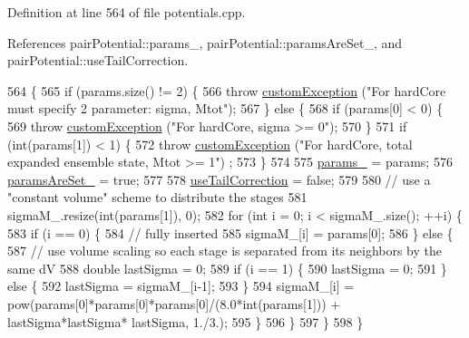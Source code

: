 Definition at line 564 of file potentials.\-cpp.



References pair\-Potential\-::params\-\_\-, pair\-Potential\-::params\-Are\-Set\-\_\-, and pair\-Potential\-::use\-Tail\-Correction.


\begin{DoxyCode}
564                                                                \{
565     \textcolor{keywordflow}{if} (params.size() != 2) \{
566         \textcolor{keywordflow}{throw} \hyperlink{classcustom_exception}{customException} (\textcolor{stringliteral}{"For hardCore must specify 2 parameter: sigma, Mtot"});
567     \} \textcolor{keywordflow}{else} \{
568         \textcolor{keywordflow}{if} (params[0] < 0) \{
569             \textcolor{keywordflow}{throw} \hyperlink{classcustom_exception}{customException} (\textcolor{stringliteral}{"For hardCore, sigma >= 0"});
570         \}
571         \textcolor{keywordflow}{if} (\textcolor{keywordtype}{int}(params[1]) < 1) \{
572             \textcolor{keywordflow}{throw} \hyperlink{classcustom_exception}{customException} (\textcolor{stringliteral}{"For hardCore, total expanded ensemble state, Mtot >= 1"})
      ;
573         \}
574 
575         \hyperlink{classpair_potential_abf8ec8af983d6e9960bd149da099e883}{params\_} = params;
576         \hyperlink{classpair_potential_a635755c0a952bfc05a4cfae230c3dbd2}{paramsAreSet\_} = \textcolor{keyword}{true};
577 
578         \hyperlink{classpair_potential_ab4b4538a7e13771f50a29aaac2443037}{useTailCorrection} = \textcolor{keyword}{false};
579 
580         \textcolor{comment}{// use a "constant volume" scheme to distribute the stages}
581         sigmaM\_.resize(\textcolor{keywordtype}{int}(params[1]), 0);
582         \textcolor{keywordflow}{for} (\textcolor{keywordtype}{int} i = 0; i < sigmaM\_.size(); ++i) \{
583             \textcolor{keywordflow}{if} (i == 0) \{
584                 \textcolor{comment}{// fully inserted}
585                 sigmaM\_[i] = params[0];
586             \} \textcolor{keywordflow}{else} \{
587                 \textcolor{comment}{// use volume scaling so each stage is separated from its neighbors by the same dV}
588                 \textcolor{keywordtype}{double} lastSigma = 0;
589                 \textcolor{keywordflow}{if} (i == 1) \{
590                     lastSigma = 0;
591                 \} \textcolor{keywordflow}{else} \{
592                     lastSigma = sigmaM\_[i-1];
593                 \}
594                 sigmaM\_[i] = pow(params[0]*params[0]*params[0]/(8.0*\textcolor{keywordtype}{int}(params[1])) + lastSigma*lastSigma*
      lastSigma, 1./3.);
595             \}
596         \}
597     \}
598 \}
\end{DoxyCode}
